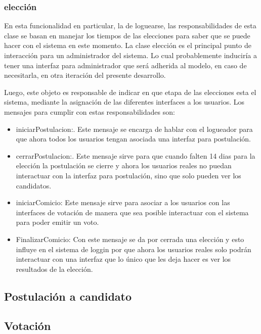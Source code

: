 \subsubsection{elecci\'on}

En esta funcionalidad en particular, la de loguearse, las responsabilidades de esta clase se basan en manejar los tiempos de las elecciones para saber que se puede hacer con el sistema en este momento. La clase elecci\'on es el principal punto de interacci\'on para un administrador del sistema. Lo cual probablemente inducir\'ia a tener una interfaz para administrador que ser\'a adherida al modelo, en caso de necesitarla, en otra iteraci\'on del presente desarrollo.

Luego, este objeto es responsable de indicar en que etapa de las elecciones esta el sistema, mediante la asignaci\'on de las diferentes interfaces a los usuarios. Los mensajes para cumplir con estas responsabilidades son:

\begin{itemize}
\item iniciarPostulacion:. Este mensaje se encarga de hablar con el logueador para que ahora todos los usuarios tengan asociada una interfaz para postulaci\'on.
\item cerrarPostulacion:. Este mensaje sirve para que cuando falten 14 dias para la elecci\'on la postulaci\'on se cierre y ahora los usuarios reales no puedan interactuar con la interfaz para postulaci\'on, sino que solo pueden ver los candidatos.
\item iniciarComicio: Este mensaje sirve para asociar a los usuarios con las interfaces de votaci\'on de manera que sea posible interactuar con el sistema para poder emitir un voto.
\item FinalizarComicio: Con este mensaje se da por cerrada una elecci\'on y esto influye en el sistema de loggin por que ahora los usuarios reales solo podr\'an interactuar con una interfaz que lo \'unico que les deja hacer es ver los resultados de la elecci\'on. 
\end{itemize}




\subsection{Postulaci\'on a candidato}

\subsection{Votaci\'on}

